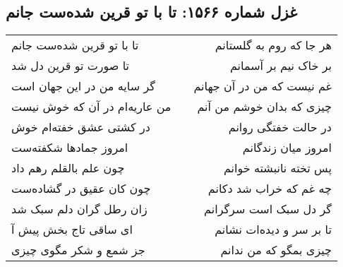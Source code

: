 \begin{center}
\section*{غزل شماره ۱۵۶۶: تا با تو قرین شده‌ست جانم}
\label{sec:1566}
\begin{longtable}{l p{0.5cm} r}
تا با تو قرین شده‌ست جانم
&&
هر جا که روم به گلستانم
\\
تا صورت تو قرین دل شد
&&
بر خاک نیم بر آسمانم
\\
گر سایه من در این جهان است
&&
غم نیست که من در آن جهانم
\\
من عاریه‌ام در آن که خوش نیست
&&
چیزی که بدان خوشم من آنم
\\
در کشتی عشق خفته‌ام خوش
&&
در حالت خفتگی روانم
\\
امروز جمادها شکفته‌ست
&&
امروز میان زندگانم
\\
چون علم بالقلم رهم داد
&&
پس تخته نانبشته خوانم
\\
چون کان عقیق در گشاده‌ست
&&
چه غم که خراب شد دکانم
\\
زان رطل گران دلم سبک شد
&&
گر دل سبک است سرگرانم
\\
ای ساقی تاج بخش پیش آ
&&
تا بر سر و دیده‌ات نشانم
\\
جز شمع و شکر مگوی چیزی
&&
چیزی بمگو که من ندانم
\\
\end{longtable}
\end{center}
